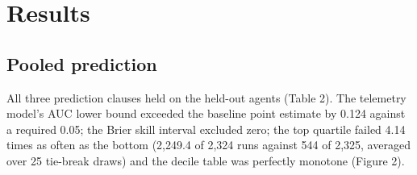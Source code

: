 \documentclass[
  11pt,
  a4paper,
]{article}
\begin{document}
\hypertarget{results}{%
\section{Results}\label{results}}

\hypertarget{pooled-prediction}{%
\subsection{Pooled prediction}\label{pooled-prediction}}

All three prediction clauses held on the held-out agents (Table 2). The
telemetry model's AUC lower bound exceeded the baseline point estimate
by 0.124 against a required 0.05; the Brier skill interval excluded
zero; the top quartile failed 4.14 times as often as the bottom (2,249.4
of 2,324 runs against 544 of 2,325, averaged over 25 tie-break draws)
and the decile table was perfectly monotone (Figure 2).
\end{document}
